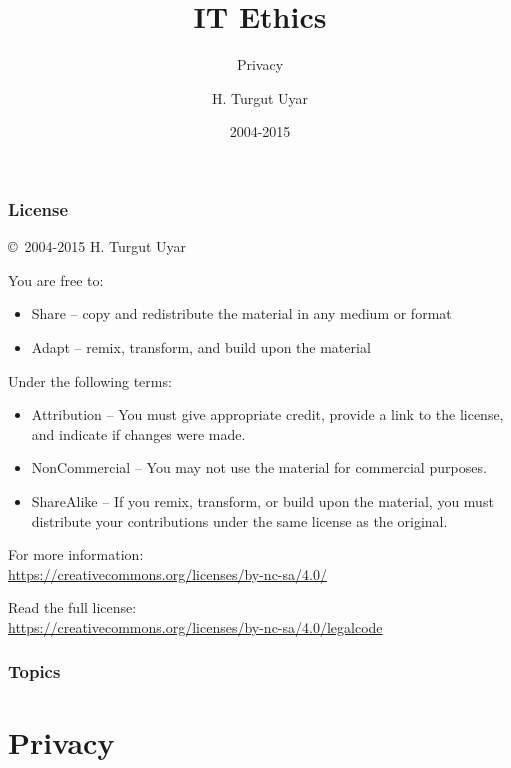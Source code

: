 \documentclass[dvipsnames]{beamer}
\title{IT Ethics}
\subtitle{Privacy}
\author{H. Turgut Uyar}
\date{2004-2015}
\theoremstyle{plain}
\begin{document}
\begin{frame}
  \titlepage
\end{frame}

\begin{frame}
  \frametitle{License}

  \hfill
  \copyright~2004-2015 H. Turgut Uyar

  \vfill
  \begin{footnotesize}
    You are free to:
    \begin{itemize}
      \itemsep0em
      \item Share -- copy and redistribute the material in any medium or format
      \item Adapt -- remix, transform, and build upon the material
    \end{itemize}

    Under the following terms:
    \begin{itemize}
      \itemsep0em
      \item Attribution -- You must give appropriate credit, provide a link to
        the license, and indicate if changes were made.

      \item NonCommercial -- You may not use the material for commercial
        purposes.

      \item ShareAlike -- If you remix, transform, or build upon the material,
        you must distribute your contributions under the same license as the
        original.
    \end{itemize}
  \end{footnotesize}

  \begin{small}
    For more information:\\
    \url{https://creativecommons.org/licenses/by-nc-sa/4.0/}

    \smallskip
    Read the full license:\\
    \url{https://creativecommons.org/licenses/by-nc-sa/4.0/legalcode}
  \end{small}
\end{frame}

\begin{frame}
  \frametitle{Topics}
  \tableofcontents
\end{frame}

\section{Privacy}
\end{document}
